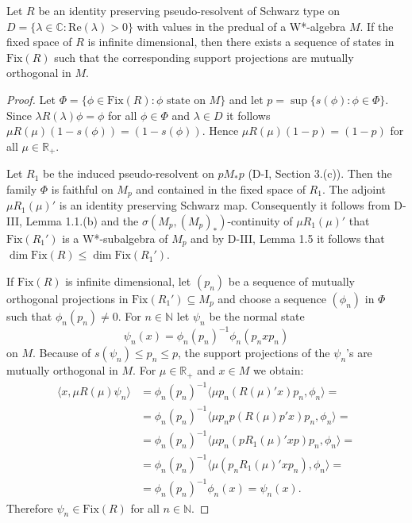 \begin{lemma}\label{lem:d4-4-1}
Let \(R\) be an identity preserving pseudo-resolvent of Schwarz type on \(D = \{\lambda \in \mathbb{C}: \text{Re}(\lambda) > 0\}\) with values in the predual of a W*-algebra \(M\).
If the fixed space of \(R\) is infinite dimensional, then there exists a sequence of states in \(\text{Fix}(R)\) such that the corresponding support projections are mutually orthogonal in \(M\).
\end{lemma}

\begin{proof}
Let \(\Phi = \{\phi \in \text{Fix}(R): \phi \text{ state on } M\}\) and let \(p = \sup\{s(\phi): \phi \in \Phi\}\).
Since \(\lambda R(\lambda)\phi = \phi\) for all \(\phi \in \Phi\) and \(\lambda \in D\) it follows \(\mu R(\mu)(1-s(\phi)) = (1-s(\phi))\).
Hence \(\mu R(\mu)(1-p) = (1-p)\) for all \(\mu \in \mathbb{R}_{+}\).

Let \(R_{1}\) be the induced pseudo-resolvent on \(pM_{*}p\) (D-I, Section 3.(c)).
Then the family \(\Phi\) is faithful on \(M_{p}\) and contained in the fixed space of \(R_{1}\).
The adjoint \(\mu R_{1}(\mu)'\) is an identity preserving Schwarz map.
Consequently it follows from D-III, Lemma 1.1.(b) and the \(\sigma(M_{p},(M_{p})_{*})\)-continuity of \(\mu R_{1}(\mu)'\) that \(\text{Fix}(R_{1}')\) is a W*-subalgebra of \(M_{p}\) and by D-III, Lemma 1.5 it follows that \(\dim \text{Fix}(R) \leq \dim \text{Fix}(R_{1}')\).

If \(\text{Fix}(R)\) is infinite dimensional, let \((p_{n})\) be a sequence of mutually orthogonal projections in \(\text{Fix}(R_{1}') \subseteq M_{p}\) and choose a sequence \((\phi_{n})\) in \(\Phi\) such that \(\phi_{n}(p_{n}) \neq 0\).
For \(n \in \mathbb{N}\) let \(\psi_{n}\) be the normal state
\[
\psi_{n}(x) = \phi_{n}(p_{n})^{-1}\phi_{n}(p_{n}xp_{n})
\]
on \(M\).
Because of \(s(\psi_{n}) \leq p_{n} \leq p\), the support projections of the \(\psi_{n}\)'s are mutually orthogonal in \(M\).
For \(\mu \in \mathbb{R}_{+}\) and \(x \in M\) we obtain:
\[
\begin{aligned}
\langle x,\mu R(\mu)\psi_{n}\rangle &= \phi_{n}(p_{n})^{-1}\langle\mu p_{n}(R(\mu)'x)p_{n},\phi_{n}\rangle = \\
&= \phi_{n}(p_{n})^{-1}\langle\mu p_{n}p(R(\mu)p'x)p_{n},\phi_{n}\rangle = \\
&= \phi_{n}(p_{n})^{-1}\langle\mu p_{n}(pR_{1}(\mu)'xp)p_{n},\phi_{n}\rangle = \\
&= \phi_{n}(p_{n})^{-1}\langle\mu(p_{n}R_{1}(\mu)'xp_{n}),\phi_{n}\rangle = \\
&= \phi_{n}(p_{n})^{-1}\phi_{n}(x) = \psi_{n}(x).
\end{aligned}
\]
Therefore \(\psi_{n} \in \text{Fix}(R)\) for all \(n \in \mathbb{N}\).
\end{proof}


